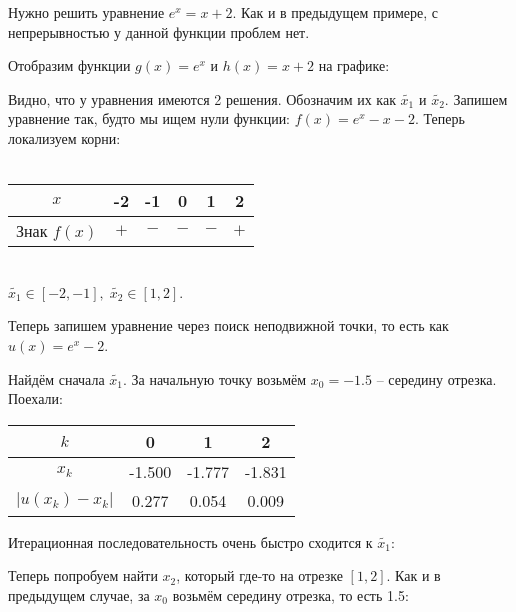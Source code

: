 \documentclass[../main.tex]{subfile}
\begin{document}
\begin{example}
	Нужно решить уравнение \(e^x=x+2.\) Как и в предыдущем примере, с
	непрерывностью у данной функции проблем нет.

	Отобразим функции $g(x)=e^x$ и $h(x)=x+2$ на графике:

	{\makeatletter
	\let\par\@@par
	\par{}
	\everypar{}
	\begin{wrapfigure}{l}{0.45\textwidth}
		
	\end{wrapfigure}

	Видно, что у уравнения имеются 2 решения. Обозначим их как
	$\widetilde{x_1}$ и $\widetilde{x_2}$. Запишем уравнение так, будто мы
	ищем нули функции: $f(x) = e^x-x-2$. Теперь локализуем корни:\\\\
	\begin{tabular}{ *{6}{|c}| }
		\hline
		$x$		& -2	& -1	& 0	& 1	& 2 \\
		\hline
		Знак $f(x)$ 	& $+$	& $-$	& $-$	& $-$ 	& $+$\\
		\hline
	\end{tabular}
	\\

	$\widetilde{x_1}\in[-2,-1],\;\widetilde{x_2}\in[1,2]$.

	Теперь запишем уравнение через поиск неподвижной точки, то есть как
	$u(x)=e^x-2$.
	\par}


	Найдём сначала $\widetilde{x_1}$. За начальную точку возьмём $x_0=-1.5$ --
	середину отрезка. Поехали:
	\newline

	\begin{tabular}{*{4}{|c}|}
		\hline
		$k$		& 0	& 1	& 2	\\
		\hline
		$x_k$		&-1.500	&-1.777	&-1.831	\\
		\hline
		$|u(x_k)-x_k|$	& 0.277	& 0.054	& 0.009	\\
		\hline
	\end{tabular}
	\newline

	\newpage
	Итерационная последовательность очень быстро сходится к
	$\widetilde{x_1}$:
	\newline

	

	Теперь попробуем найти $x_2$, который где-то на отрезке $[1,2]$. Как и
	в предыдущем случае, за $x_0$ возьмём середину отрезка, то есть 1.5:
	\newline


\end{example}
\end{document}
